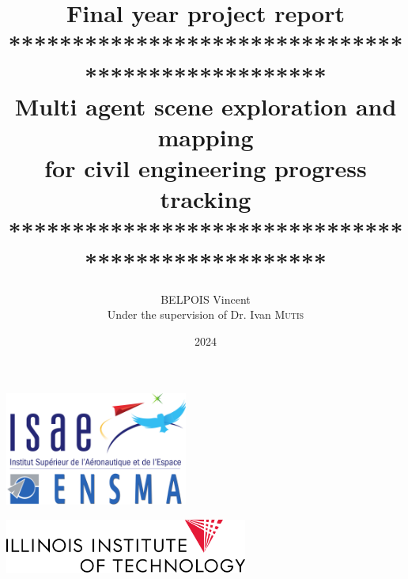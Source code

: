 \documentclass[11pt]{article}
\title{Final year project report\vspace{10pt}\\**************************************************\\Multi agent scene exploration and mapping \\
for civil engineering progress tracking\vspace{10pt} \\**************************************************}
\author{BELPOIS Vincent \\ Under the supervision of Dr. Ivan \textsc{Mutis}}
\begin{document}
\date{2024}
\maketitle
\thispagestyle{empty}

\vspace{10mm}

    \begin{center}
    \includegraphics[width = 6cm]{Images/logo_ensma.png}
    \end{center}
    \vspace{2cm}
    \begin{center}
        \includegraphics[width = 8cm]{Images/IIT_Logo_stack_186_blk.png}
    \end{center}
    \newpage
    \thispagestyle{empty}
    \mbox{}
    
    

    
\end{document}
